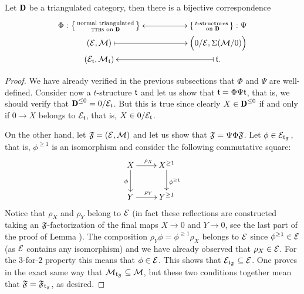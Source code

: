 \begin{theorem}\label{triang-rosetta}
Let $\cD$ be a triangulated category, then there is a bijective correspondence
\[
\xymatrix@R=0pt{
\Phi:\left\{
{\begin{smallmatrix}
\text{normal triangulated}\\
\text{\textsc{tth}s on }\cD
\end{smallmatrix}}
\right\}
\ar@{<->}[rr]&&
\left\{
{\begin{smallmatrix}
\text{$t$-structures}\\
\text{ on }\cD
\end{smallmatrix}}
\right\}:\Psi\\
(\E,\M) \ar@{|->}[rr]&& \Big(0/\E, \Sigma(\M/0)\Big) \\
(\E_\t,\M_\t) \ar@{<-|}[rr]&& \t.
}
\]
%
%
\end{theorem}
\begin{proof}
We have already verified in the previous subsections that $\Phi$ and $\Psi$ are well-defined. Consider now a $t$-structure $\mathfrak{t}$ and let us show that $\mathfrak{t}=\Phi\Psi\mathfrak{t}$, that is, we should verify that $ \cD^{\leq 0} =0/\E_\t$. But this is true since clearly $X\in  \cD^{\leq 0} $ if and only if $0\to X$ belongs to $\mathcal{E}_{\mathfrak{t}}$, that is, $X\in 0/\mathcal{E}_{\mathfrak{t}}$. 

On the other hand, let $\mathfrak{F}=(\mathcal{E},\mathcal{M})$ and let us show that $\mathfrak{F}=\Psi\Phi\mathfrak{F}$. Let $\phi\in \mathcal{E}_{\mathfrak{t}_{\mathfrak{F}}}$, that is, $\phi^{\geq1}$ is an isomorphism and consider the following commutative square:
\[
\xymatrix{
X\ar[r]^{\rho_X}\ar[d]_\phi&X^{\geq1}\ar[d]^{\phi^{\geq1}}\\
Y\ar[r]^{\rho_Y}&Y^{\geq1}
}
\]
Notice that $\rho_X$ and $\rho_Y$ belong to $\mathcal{E}$ (in fact these reflections are constructed taking an $\mathfrak{F}$-factorization of the final maps $X\to 0$ and $Y\to 0$, see the last part of the proof of Lemma ). The composition $\rho_Y\phi=\phi^{\geq1}\rho_X$ belongs to $\mathcal{E}$ since $\phi^{\geq1}\in \mathcal{E}$ (as $\mathcal{E}$ contains any isomorphism) and we have already observed that $\rho_X\in \mathcal{E}$. For the $3$-for-$2$ property this means that $\phi\in \mathcal{E}$. This shows that $\mathcal{E}_{\mathfrak{t}_{\mathfrak{F}}}\subseteq \mathcal{E}$. One proves in the exact same way that $\mathcal{M}_{\mathfrak{t}_{\mathfrak{F}}}\subseteq \mathcal{M}$, but these two conditions together mean that $\mathfrak{F}=\mathfrak{F}_{\mathfrak{t}_{\mathfrak{F}}}$, as desired.\end{proof}
